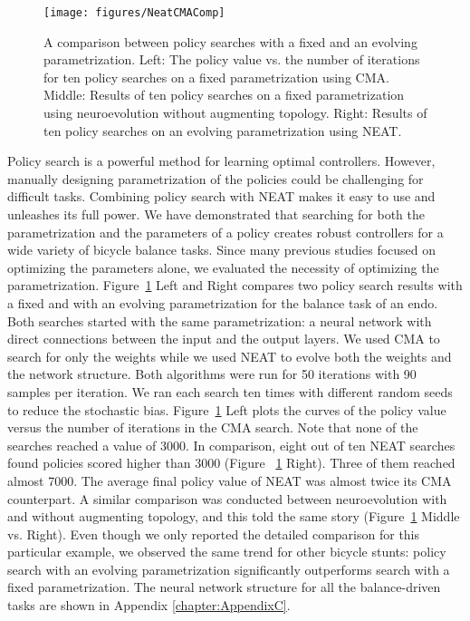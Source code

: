 \begin{figure}[ht]
  \centering
  \texttt{[image: figures/NeatCMAComp]}
  \caption{A comparison between policy searches with a fixed and an evolving parametrization. Left: The policy value vs. the number of iterations for ten policy searches on a fixed parametrization using CMA. Middle: Results of ten policy searches on a fixed parametrization using neuroevolution without augmenting topology. Right: Results of ten policy searches on an evolving parametrization using NEAT. }
  \label{fig:compare}
\end{figure}

Policy search is a powerful method for learning optimal controllers. However, manually designing parametrization of the policies could be challenging for difficult tasks. Combining policy search with NEAT makes it easy to use and unleashes its full power. We have demonstrated that searching for both the parametrization and the parameters of a policy creates robust controllers for a wide variety of bicycle balance tasks. Since many previous studies focused on optimizing the parameters alone, we evaluated the necessity of optimizing the parametrization. Figure~\ref{fig:compare} Left and Right compares two policy search results with a fixed and with an evolving parametrization for the balance task of an endo. Both searches started with the same parametrization: a neural network with direct connections between the input and the output layers. We used CMA to search for only the weights while we used NEAT to evolve both the weights and the network structure. Both algorithms were run for 50 iterations with 90 samples per iteration. We ran each search ten times with different random seeds to reduce the stochastic bias. Figure~\ref{fig:compare} Left plots the curves of the policy value versus the number of iterations in the CMA search. Note that none of the searches reached a value of 3000. In comparison, eight out of ten NEAT searches found policies scored higher than 3000 (Figure ~\ref{fig:compare} Right). Three of them reached almost 7000. The average final policy value of NEAT was almost twice its CMA counterpart. A similar comparison was conducted between neuroevolution with and without augmenting topology, and this told the same story (Figure~\ref{fig:compare} Middle vs. Right). Even though we only reported the detailed comparison for this particular example, we observed the same trend for other bicycle stunts: policy search with an evolving parametrization significantly outperforms search with a fixed parametrization. The neural network structure for all the balance-driven tasks are shown in Appendix \ref{chapter:AppendixC}.

